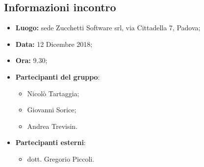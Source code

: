 \subsection{Informazioni incontro}
\begin{itemize}
	\item { \textbf{Luogo:} sede Zucchetti Software srl, via Cittadella 7, Padova};
	\item { \textbf{Data:} 12 Dicembre 2018; }
	\item { \textbf{Ora:} 9.30; }
	\item { \textbf{Partecipanti del gruppo}:}
	{	\begin{itemize}
		 	\item Nicolò Tartaggia; 
		 	\item Giovanni Sorice;
		 	\item Andrea Trevisin.   		  
	 	\end{itemize} 
 	}
	\item { \textbf{Partecipanti esterni}:
		 \begin{itemize}
		 	\item  dott. Gregorio Piccoli.
		 \end{itemize}
		 }
\end{itemize}


